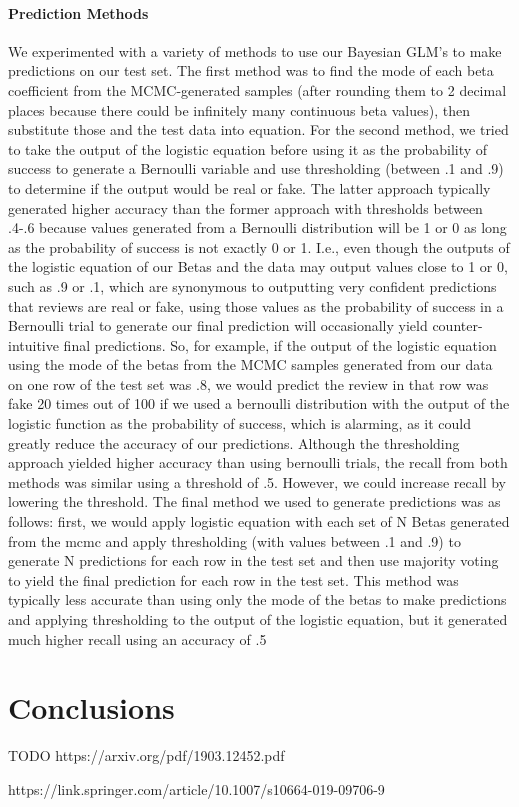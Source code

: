 \documentclass[man, floatsintext, 10pt]{apa6}
\begin{document}
\vspace{2mm}

\paragraph{Prediction Methods} We experimented with a variety of methods to use our Bayesian GLM's to make predictions on our test set. The first method was to find the mode of each beta coefficient from the MCMC-generated samples (after rounding them to 2 decimal places because there could be infinitely many continuous beta values), then substitute those and the test data into equation. For the second method, we tried to take the output of the logistic equation before using it as the probability of success to generate a Bernoulli variable and use thresholding (between .1 and .9) to determine if the output would be real or fake. The latter approach typically generated higher accuracy than the former approach with thresholds between .4-.6 because values generated from a Bernoulli distribution will be 1 or 0 as long as the probability of success is not exactly 0 or 1. I.e., even though the outputs of the logistic equation of our Betas and the data may output values close to 1 or 0, such as .9 or .1, which are synonymous to outputting very confident predictions that reviews are real or fake, using those values as the probability of success in a Bernoulli trial to generate our final prediction will occasionally yield counter-intuitive final predictions. So, for example, if the output of the logistic equation using the mode of the betas from the MCMC samples generated from our data on one row of the test set was .8, we would predict the review in that row was fake 20 times out of 100 if we used a bernoulli distribution with the output of the logistic function as the probability of success, which is alarming, as it could greatly reduce the accuracy of our predictions. Although the thresholding approach yielded higher accuracy than using bernoulli trials, the recall from both methods was similar using a threshold of .5. However, we could increase recall by lowering the threshold. The final method we used to generate predictions was as follows: first, we would apply logistic equation with each set of N Betas generated from the mcmc and apply thresholding (with values between .1 and .9) to generate N predictions for each row in the test set and then use majority voting to yield the final prediction for each row in the test set. This method was typically less accurate than using only the mode of the betas to make predictions and applying thresholding to the output of the logistic equation, but it generated much higher recall using an accuracy of .5

\section{Conclusions} 

TODO https://arxiv.org/pdf/1903.12452.pdf

https://link.springer.com/article/10.1007/s10664-019-09706-9
\end{document}
